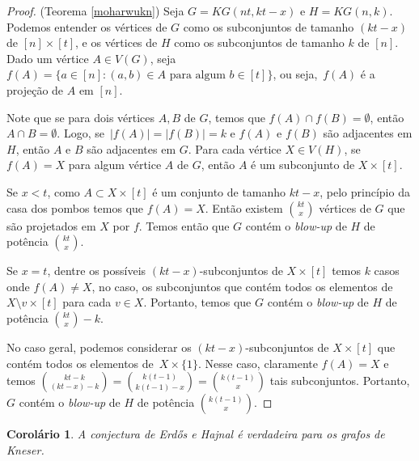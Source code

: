 \documentclass{article}
\newtheorem{corolario}{Corolário}
\begin{document}
\begin{proof}{(Teorema \ref{moharwukn})}
Seja $G = KG(nt, kt-x)$ e $H = KG(n,k)$. Podemos entender os vértices de $G$ como os subconjuntos de tamanho $(kt-x)$ de $[n]\times [t]$, e os vértices de $H$ como os subconjuntos de tamanho $k$ de $[n]$. Dado um vértice $A\in V(G)$, seja $f(A) = \{a\in [n] : (a,b)\in A \text{ para algum }b\in [t]\}$, ou seja,~$f(A)$ é a projeção de $A$ em $[n]$.

Note que se para dois vértices $A,B$ de $G$, temos que $f(A)\cap f(B) = \emptyset$, então $A\cap B = \emptyset$. Logo, se~$|f(A)| = |f(B)| = k$ e $f(A)$ e $f(B)$ são adjacentes em $H$, então $A$ e $B$ são adjacentes em $G$. Para cada vértice $X\in V(H)$, se $f(A) = X$ para algum vértice $A$ de $G$, então $A$ é um subconjunto de $X \times [t]$.

Se $x<t$, como $A \subset X \times [t]$ é um conjunto de tamanho $kt-x$, pelo princípio da casa dos pombos temos que $f(A) = X$. Então existem $\binom{kt}{x}$ vértices de $G$ que são projetados em $X$ por $f$. Temos então que $G$ contém o \textit{blow-up} de $H$ de potência $\binom{kt}{x}$.

Se $x=t$, dentre os possíveis $(kt-x)$-subconjuntos de $X \times [t]$ temos $k$ casos onde $f(A) \neq X$, no caso, os subconjuntos que contém todos os elementos de $X\setminus v \times [t]$ para cada $v\in X$. Portanto, temos que $G$ contém o \textit{blow-up} de $H$ de potência $\binom{kt}{x}-k$.

No caso geral, podemos considerar os $(kt-x)$-subconjuntos de $X\times [t]$ que contém todos os elementos de~$X \times \{1\}$. Nesse caso, claramente $f(A) = X$ e temos $\binom{kt-k}{(kt-x)-k} = \binom{k(t-1)}{k(t-1)-x} = \binom{k(t-1)}{x}$ tais subconjuntos. Portanto, $G$ contém o \textit{blow-up} de $H$ de potência $\binom{k(t-1)}{x}$.
\end{proof}

\begin{corolario}\label{knesercor}
A conjectura de Erd\H{o}s e Hajnal é verdadeira para os grafos de Kneser.
\end{corolario}
\end{document}
